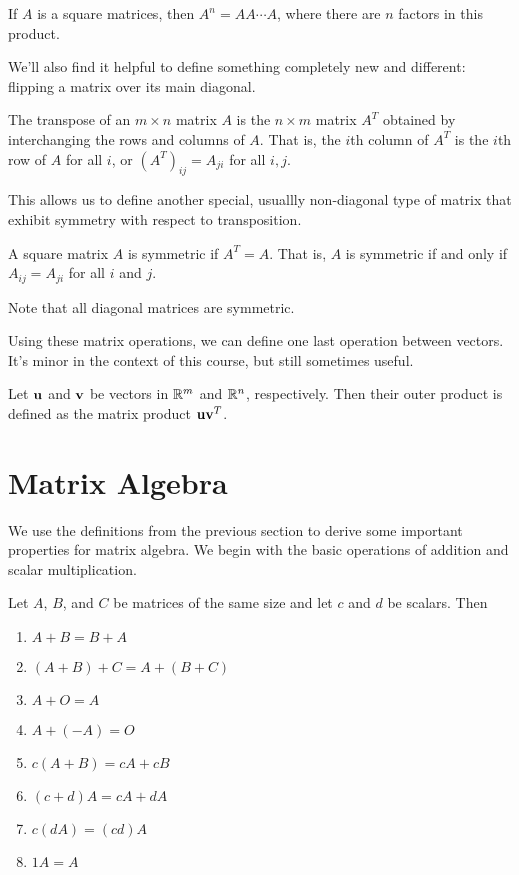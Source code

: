 \documentclass[../m73main.tex]{chapters}
\begin{document}
\begin{definition}
	If $A$ is a square matrices, then $A^n = AA\cdots A$, where there are $n$ factors in this product.
\end{definition}

We'll also find it helpful to define something completely new and different: flipping a matrix over its main diagonal.

\begin{definition}
	The transpose of an $m\times n$ matrix $A$ is the $n\times m$ matrix $A^T$ obtained by interchanging the rows and columns of $A$.
	That is, the $i$th column of $A^T$ is the $i$th row of $A$ for all $i$, or $(A^T)_{ij} = A_{ji}$ for all $i, j$.
\end{definition}

This allows us to define another special, usuallly non-diagonal type of matrix that exhibit symmetry with respect to transposition.

\begin{definition}
	A square matrix $A$ is symmetric if $A^T = A$.
	That is, $A$ is symmetric if and only if $A_{ij} = A_{ji}$ for all $i$ and $j$.
\end{definition}

Note that all diagonal matrices are symmetric.

Using these matrix operations, we can define one last operation between vectors.
It's minor in the context of this course, but still sometimes useful.

\begin{definition}
	Let $\mathbf{u}$ and $\mathbf{v}$ be vectors in $\mathbb{R}^m$ and $\mathbb{R}^n$, respectively.
	Then their outer product is defined as the matrix product $\mathbf{u}\mathbf{v}^T$.
\end{definition}

\section{Matrix Algebra}
We use the definitions from the previous section to derive some important properties for matrix algebra.
We begin with the basic operations of addition and scalar multiplication.

\begin{theorem}
	Let $A$, $B$, and $C$ be matrices of the same size and let $c$ and $d$ be scalars.
	Then
	\begin{enumerate}[label=(\alph*)]
		\item $A + B = B + A$
		\item $(A + B) + C = A + (B + C)$
		\item $A + O = A$
		\item $A + (-A) = O$
		\item $c(A + B) = cA + cB$
		\item $(c+d)A = cA + dA$
		\item $c(dA) = (cd)A$
		\item $1A = A$
	\end{enumerate}
\end{theorem}
\end{document}
